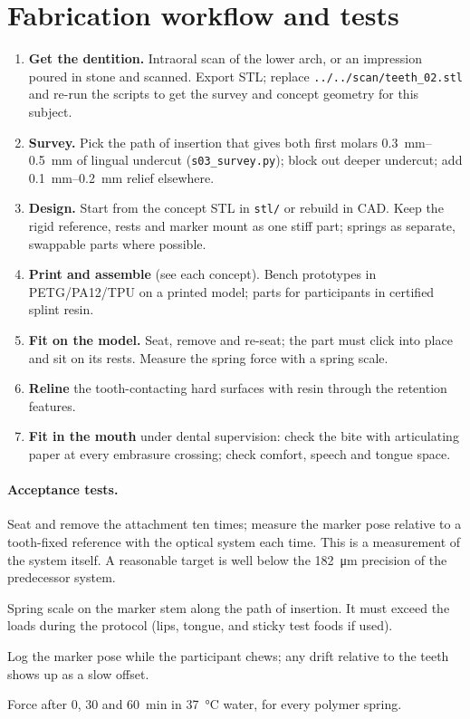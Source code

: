 
\section{Fabrication workflow and tests}\label{sec:workflow}
\begin{enumerate}
\item \textbf{Get the dentition.} Intraoral scan of the lower arch, or an impression poured in stone
and scanned. Export STL; replace \texttt{../../scan/teeth\_02.stl} and re-run the scripts to get the
survey and concept geometry for this subject.
\item \textbf{Survey.} Pick the path of insertion that gives both first molars
\SIrange{0.3}{0.5}{mm} of lingual undercut (\texttt{s03\_survey.py}); block out deeper undercut;
add \SIrange{0.1}{0.2}{mm} relief elsewhere.
\item \textbf{Design.} Start from the concept STL in \texttt{stl/} or rebuild in CAD. Keep the rigid
reference, rests and marker mount as one stiff part; springs as separate, swappable parts where
possible.
\item \textbf{Print and assemble} (see each concept). Bench prototypes in PETG/PA12/TPU on a printed
model; parts for participants in certified splint resin.
\item \textbf{Fit on the model.} Seat, remove and re-seat; the part must click into place and sit on
its rests. Measure the spring force with a spring scale.
\item \textbf{Reline} the tooth-contacting hard surfaces with resin through the retention features.
\item \textbf{Fit in the mouth} under dental supervision: check the bite with articulating paper at
every embrasure crossing; check comfort, speech and tongue space.
\end{enumerate}

\paragraph{Acceptance tests.}
\begin{description}[style=nextline]
\item[Seating repeatability] Seat and remove the attachment ten times; measure the marker pose
relative to a tooth-fixed reference with the optical system each time. This is a measurement of
the system itself. A reasonable target is well below the
\SI{182}{\micro\metre} precision of the predecessor system.
\item[Pull-off force] Spring scale on the marker stem along the path of insertion. It must exceed
the loads during the protocol (lips, tongue, and sticky test foods if used).
\item[Stability under load] Log the marker pose while the participant chews; any drift relative to
the teeth shows up as a slow offset.
\item[Preload decay] Force after 0, 30 and \SI{60}{min} in \SI{37}{\celsius} water, for every
polymer spring.
\end{description}
